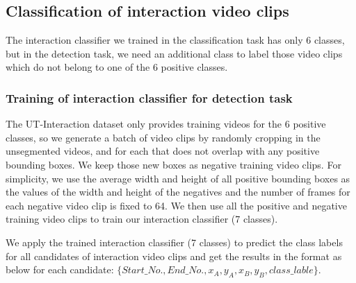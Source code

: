 \subsection{Classification of interaction video clips}
The interaction classifier we trained in the classification task has only 6 classes, but in the detection task, we need an additional class to label those video clips which do not belong to one of the 6 positive classes. 
\subsubsection*{Training of interaction classifier for detection task}
\label{extra_class}
The UT-Interaction dataset only provides training videos for the 6 positive classes, so we generate a batch of video clips by randomly cropping in the unsegmented videos, and for each that does not overlap with any positive bounding boxes. We keep those new boxes as negative training video clips. For simplicity, we use the average width and height of all positive bounding boxes as the values of the width and height of the negatives and the number of frames for each negative video clip is fixed to 64.  We then use all the positive and negative training video clips to train our interaction classifier (7 classes). 
\par 
We apply the trained interaction classifier (7 classes) to predict the class labels for all candidates of interaction video clips and get the results in the format as below for each candidate: \(\{Start\_No., End\_No., x_A,y_A,x_B,y_B,class\_lable\}\).  
 
